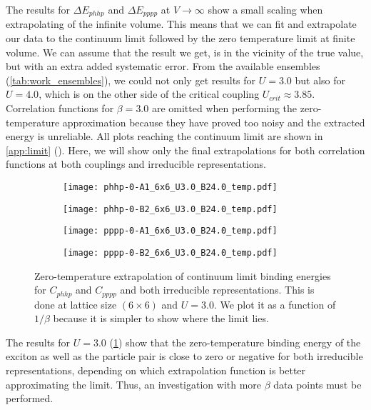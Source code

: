 The results for $\Delta E_{phhp}$ and $\Delta E_{pppp}$ at $V\to\infty$ show a small scaling when extrapolating of the infinite volume. This means that we can fit and extrapolate our data to the continuum limit followed by the zero temperature limit at finite volume. We can assume that the result we get, is in the vicinity of the true value, but with an extra added systematic error. From the available ensembles (\cref{tab:work_ensembles}), we could not only get results for $U=3.0$ but also for $U=4.0$, which is on the other side of the critical coupling $U_{crit}\approx 3.85$. Correlation functions for $\beta = 3.0$ are omitted when performing the zero-temperature approximation because they have proved too noisy and the extracted energy is unreliable. All plots reaching the continuum limit are shown in \cref{app:limit} (). Here, we will show only the final extrapolations for both correlation functions at both couplings and irreducible representations.  
\begin{figure}[!htbp]
    \begin{subfigure}{.5\textwidth}
      \centering
      \texttt{[image: phhp-0-A1\_6x6\_U3.0\_B24.0\_temp.pdf]}
    \end{subfigure}%
    \begin{subfigure}{.5\textwidth}
      \centering
      \texttt{[image: phhp-0-B2\_6x6\_U3.0\_B24.0\_temp.pdf]}
    \end{subfigure}
    \begin{subfigure}{.5\textwidth}
        \centering
        \texttt{[image: pppp-0-A1\_6x6\_U3.0\_B24.0\_temp.pdf]}
    \end{subfigure}
    \begin{subfigure}{.5\textwidth}
        \centering
        \texttt{[image: pppp-0-B2\_6x6\_U3.0\_B24.0\_temp.pdf]}
    \end{subfigure}
    \caption{Zero-temperature extrapolation of continuum limit binding energies for $C_{phhp}$ and $C_{pppp}$ and both irreducible representations. This is done at lattice size $(6\times 6)$ and $U=3.0$. We plot it as a function of $1/\beta$ because it is simpler to show where the limit lies.}
    \label{fig:u3temp}
  \end{figure}
The results for $U=3.0$ (\cref{fig:u3temp}) show that the zero-temperature binding energy of the exciton as well as the particle pair is close to zero or negative for both irreducible representations, depending on which extrapolation function is better approximating the limit. Thus, an investigation with more $\beta$ data points must be performed.

